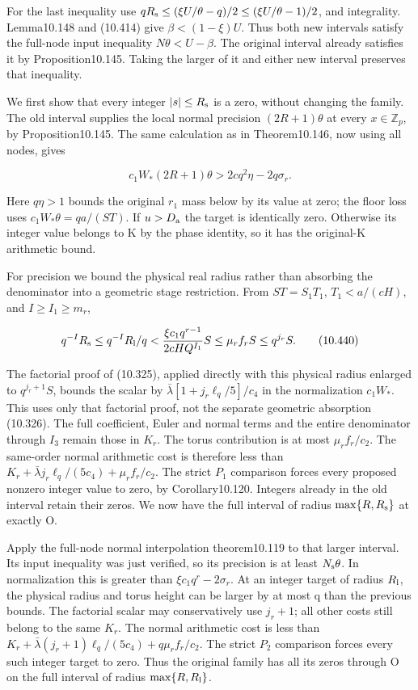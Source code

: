 \documentclass[
  11pt,
  a4paper,
]{article}
\begin{document}
For the last inequality use \(qR_{\rm s}\le(\xi U/\theta-q)/2
\le(\xi U/\theta-1)/2\), and integrality. Lemma10.148 and (10.414) give
\(\beta<(1-\xi)U\). Thus both new intervals satisfy the full-node input
inequality \(N\theta<U-\beta\). The original interval already satisfies
it by Proposition10.145. Taking the larger of it and either new interval
preserves that inequality.

We first show that every integer \(|s|\le R_{\rm s}\) is a zero, without
changing the family. The old interval supplies the local normal
precision \((2R+1)\theta\) at every \(x\in\mathbb Z_p\), by
Proposition10.145. The same calculation as in Theorem10.146, now using
all nodes, gives

\[
c_1W_*(2R+1)\theta
>2cq^2\eta-2q\sigma_r.
\tag{10.439}
\]

Here \(q\eta>1\) bounds the original \(r_1\) mass below by its value at
zero; the floor loss uses \(c_1W_*\theta=qa/(ST)\). If \(u>D_{\rm a}\)
the target is identically zero. Otherwise its integer value belongs to K
by the phase identity, so it has the original-K arithmetic bound.

For precision we bound the physical real radius rather than absorbing
the denominator into a geometric stage restriction. From \(ST=S_1T_1\),
\(T_1<a/(cH)\), and \(I\ge I_1\ge m_r\),

\[
q^{-I}R_{\rm s}
\le q^{-I}R_{\rm l}/q
<\frac{\xi c_1q^{r-1}}{2cH Q^{I_1}}S
\le\mu_rf_rS\le q^{j_r}S.
\tag{10.440}
\]

The factorial proof of (10.325), applied directly with this physical
radius enlarged to \(q^{j_r+1}S\), bounds the scalar by
\(\bar\lambda[1+j_r\ell_q/5]/c_4\) in the normalization \(c_1W_*\). This
uses only that factorial proof, not the separate geometric absorption
(10.326). The full coefficient, Euler and normal terms and the entire
denominator through \(I_3\) remain those in \(K_r\). The torus
contribution is at most \(\mu_rf_r/c_2\). The same-order normal
arithmetic cost is therefore less than
\(K_r+\bar\lambda j_r\ell_q/(5c_4)+\mu_rf_r/c_2\). The strict \(P_1\)
comparison forces every proposed nonzero integer value to zero, by
Corollary10.120. Integers already in the old interval retain their
zeros. We now have the full interval of radius \(\max\{R,R_{\rm s}\}\)
at exactly O.

Apply the full-node normal interpolation theorem10.119 to that larger
interval. Its input inequality was just verified, so its precision is at
least \(N_{\rm s}\theta\). In normalization this is greater than
\(\xi c_1q^r-2\sigma_r\). At an integer target of radius \(R_{\rm l}\),
the physical radius and torus height can be larger by at most q than the
previous bounds. The factorial scalar may conservatively use \(j_r+1\);
all other costs still belong to the same \(K_r\). The normal arithmetic
cost is less than \(K_r+\bar\lambda(j_r+1)\ell_q/(5c_4)+q\mu_rf_r/c_2\).
The strict \(P_2\) comparison forces every such integer target to zero.
Thus the original family has all its zeros through O on the full
interval of radius \(\max\{R,R_{\rm l}\}\).
\end{document}
